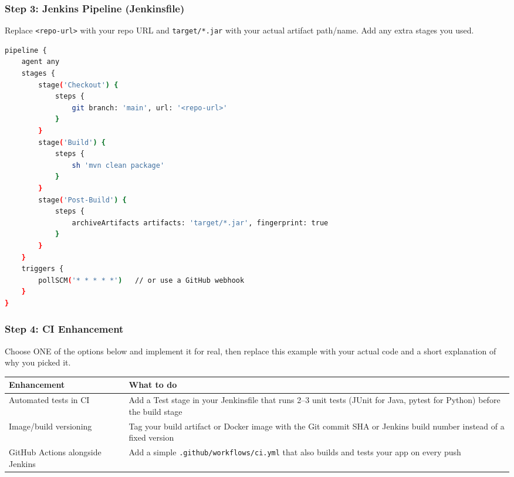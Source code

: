 \documentclass[12pt,a4paper]{article}
\newcommand{\sizeTwelve}{\fontsize{12pt}{14.5pt}\selectfont}  %
\begin{document}
\subsubsection*{Step 3: Jenkins Pipeline (Jenkinsfile)}
\begin{studentnote}
Replace \texttt{<repo-url>} with your repo URL and \texttt{target/*.jar} with your actual artifact path/name. Add any extra stages you used.
\end{studentnote}
\begin{lstlisting}[language=bash]
pipeline {
    agent any
    stages {
        stage('Checkout') {
            steps {
                git branch: 'main', url: '<repo-url>'
            }
        }
        stage('Build') {
            steps {
                sh 'mvn clean package'
            }
        }
        stage('Post-Build') {
            steps {
                archiveArtifacts artifacts: 'target/*.jar', fingerprint: true
            }
        }
    }
    triggers {
        pollSCM('* * * * *')   // or use a GitHub webhook
    }
}
\end{lstlisting}

\subsubsection*{Step 4: CI Enhancement}
\begin{studentnote}
Choose ONE of the options below and implement it for real, then replace this example with your actual code and a short explanation of why you picked it.
\end{studentnote}

{\sizeTwelve
\setlength{\tabcolsep}{4pt}
\renewcommand{\arraystretch}{1.25}
\begin{longtable}{|>{\raggedright\arraybackslash}p{4.2cm}|>{\raggedright\arraybackslash}p{9.2cm}|}
\hline
\textbf{Enhancement} & \textbf{What to do} \\
\hline
\endhead
Automated tests in CI & Add a Test stage in your Jenkinsfile that runs 2--3 unit tests (JUnit for Java, pytest for Python) before the build stage \\
\hline
Image/build versioning & Tag your build artifact or Docker image with the Git commit SHA or Jenkins build number instead of a fixed version \\
\hline
GitHub Actions alongside Jenkins & Add a simple \texttt{.github/workflows/ci.yml} that also builds and tests your app on every push \\
\hline
\end{longtable}
\par}
\end{document}
